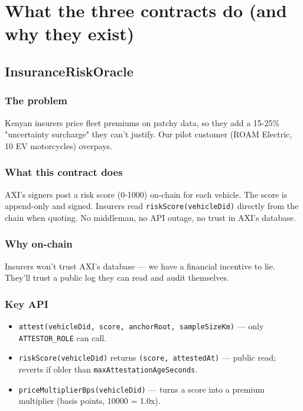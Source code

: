 \documentclass[11pt,a4paper]{article}
\begin{document}
\newpage
\section{What the three contracts do (and why they exist)}

\subsection{InsuranceRiskOracle}

\subsubsection{The problem}
Kenyan insurers price fleet premiums on patchy data, so they add a 15-25\% "uncertainty surcharge" they can't justify. Our pilot customer (ROAM Electric, 10 EV motorcycles) overpays.

\subsubsection{What this contract does}
AXI's signers post a risk score (0-1000) on-chain for each vehicle. The score is append-only and signed. Insurers read \texttt{riskScore(vehicleDid)} directly from the chain when quoting. No middleman, no API outage, no trust in AXI's database.

\subsubsection{Why on-chain}
Insurers won't trust AXI's database --- we have a financial incentive to lie. They'll trust a public log they can read and audit themselves.

\subsubsection{Key API}
\begin{itemize}[leftmargin=*, nosep]
  \item \texttt{attest(vehicleDid, score, anchorRoot, sampleSizeKm)} --- only \texttt{ATTESTOR\_ROLE} can call.
  \item \texttt{riskScore(vehicleDid)} returns \texttt{(score, attestedAt)} --- public read; reverts if older than \texttt{maxAttestationAgeSeconds}.
  \item \texttt{priceMultiplierBps(vehicleDid)} --- turns a score into a premium multiplier (basis points, 10000 = 1.0x).
\end{itemize}
\end{document}
